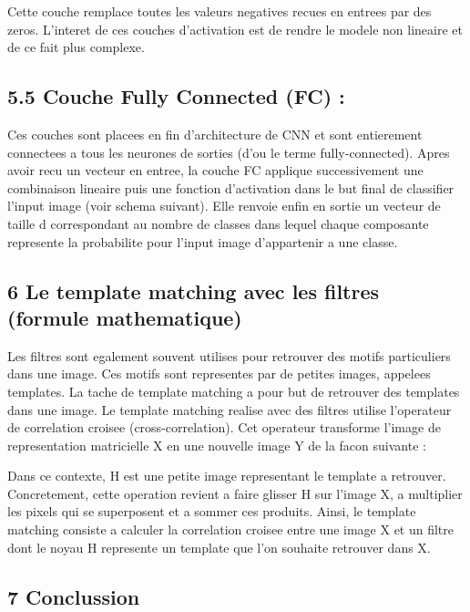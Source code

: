 \documentclass[]{article}
\begin{document}
Cette couche remplace toutes les valeurs negatives recues en entrees par
des zeros. L'interet de ces couches d'activation est de rendre le modele
non lineaire et de ce fait plus complexe.

\subsection{5.5 Couche Fully Connected (FC)
:}\label{couche-fully-connected-fc}

Ces couches sont placees en fin d'architecture de CNN et sont
entierement connectees a tous les neurones de sorties (d'ou le terme
fully-connected). Apres avoir recu un vecteur en entree, la couche FC
applique successivement une combinaison lineaire puis une fonction
d'activation dans le but final de classifier l'input image (voir schema
suivant). Elle renvoie enfin en sortie un vecteur de taille d
correspondant au nombre de classes dans lequel chaque composante
represente la probabilite pour l'input image d'appartenir a une classe.

\subsection{6 Le template matching avec les filtres (formule
mathematique)}\label{le-template-matching-avec-les-filtres-formule-mathematique}

Les filtres sont egalement souvent utilises pour retrouver des motifs
particuliers dans une image. Ces motifs sont representes par de petites
images, appelees templates. La tache de template matching a pour but de
retrouver des templates dans une image. Le template matching realise
avec des filtres utilise l'operateur de correlation croisee
(cross-correlation). Cet operateur transforme l'image de representation
matricielle X en une nouvelle image Y de la facon suivante :

Dans ce contexte, H est une petite image representant le template a
retrouver. Concretement, cette operation revient a faire glisser H sur
l'image X, a multiplier les pixels qui se superposent et a sommer ces
produits. Ainsi, le template matching consiste a calculer la correlation
croisee entre une image X et un filtre dont le noyau H represente un
template que l'on souhaite retrouver dans X.

\subsection{7 Conclussion}\label{conclussion}
\end{document}
